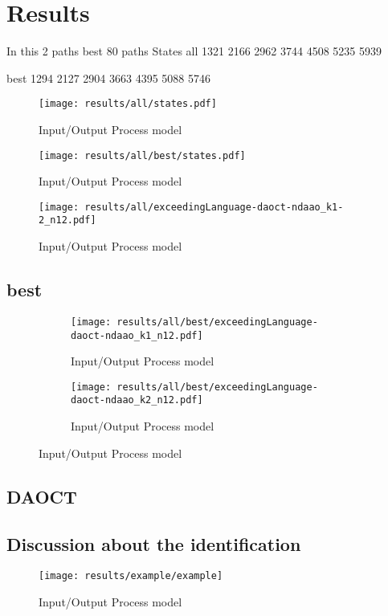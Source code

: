 \chapter{Results}
\label{cha:results}

In this 2 paths
best 80 paths States
all
1321  2166  2962  3744  4508  5235  5939

best
1294  2127  2904  3663  4395  5088  5746
\begin{figure}[H]
  \centering
  \texttt{[image: results/all/states.pdf]}
  \caption{Input\slash Output Process model}
    \label{fig:ioProcModel}
\end{figure}
\begin{figure}[H]
  \centering
  \texttt{[image: results/all/best/states.pdf]}
  \caption{Input\slash Output Process model}
    \label{fig:ioProcModel}
\end{figure}
\begin{figure}[H]
  \centering
  \texttt{[image: results/all/exceedingLanguage-daoct-ndaao\_k1-2\_n12.pdf]}
  \caption{Input\slash Output Process model}
    \label{fig:ioProcModel}
\end{figure}

 \section{best} 
\begin{figure}[H]
\begin{subfigure}[H]{0.5\textwidth}
  \centering
  \texttt{[image: results/all/best/exceedingLanguage-daoct-ndaao\_k1\_n12.pdf]}
  \caption{Input\slash Output Process model}
    \label{fig:ioProcModel}
\end{subfigure}
\begin{subfigure}[h]{0.5\textwidth}
  \centering
  \texttt{[image: results/all/best/exceedingLanguage-daoct-ndaao\_k2\_n12.pdf]}
  \caption{Input\slash Output Process model}
    \label{fig:ioProcModel}
\end{subfigure}
\end{figure}
\section{DAOCT}
\label{sec:results_daoct}

\section{Discussion about the identification}
\begin{figure}[H]
  \centering
  \texttt{[image: results/example/example]}
  \caption{Input\slash Output Process model}
    \label{fig:ioProcModel}
\end{figure}


